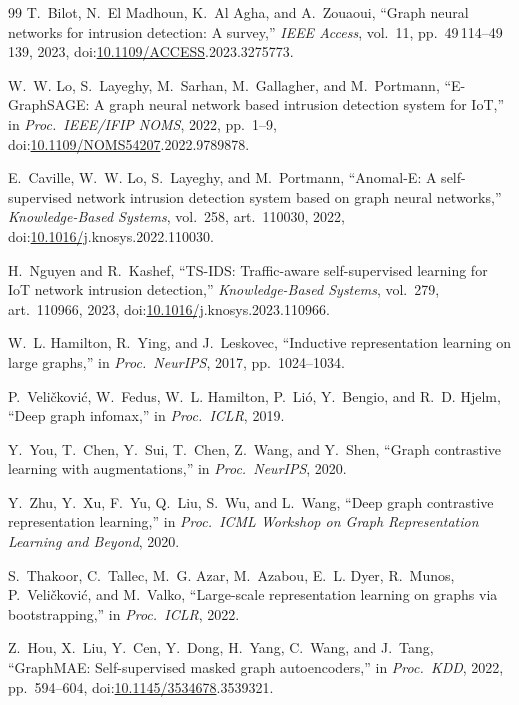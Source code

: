 \documentclass{ieeeaccess}
\begin{document}
\begin{thebibliography}{99}
T.~Bilot, N.~El Madhoun, K.~Al Agha, and A.~Zouaoui,
``Graph neural networks for intrusion detection: A survey,''
\emph{IEEE Access}, vol.~11, pp.~49\,114--49\,139, 2023,
doi:\href{https://doi.org/10.1109/ACCESS}{10.1109/ACCESS}.2023.3275773.

W.~W. Lo, S.~Layeghy, M.~Sarhan, M.~Gallagher, and M.~Portmann,
``E-GraphSAGE: A graph neural network based intrusion detection system for
IoT,'' in \emph{Proc.\ IEEE/IFIP NOMS}, 2022, pp.~1--9,
doi:\href{https://doi.org/10.1109/NOMS54207}{10.1109/NOMS54207}.2022.9789878.

E.~Caville, W.~W. Lo, S.~Layeghy, and M.~Portmann,
``Anomal-E: A self-supervised network intrusion detection system based on
graph neural networks,''
\emph{Knowledge-Based Systems}, vol.~258, art.~110030, 2022,
doi:\href{https://doi.org/10.1016/j}{10.1016/j}.knosys.2022.110030.

H.~Nguyen and R.~Kashef,
``TS-IDS: Traffic-aware self-supervised learning for IoT network intrusion
detection,''
\emph{Knowledge-Based Systems}, vol.~279, art.~110966, 2023,
doi:\href{https://doi.org/10.1016/j}{10.1016/j}.knosys.2023.110966.

W.~L. Hamilton, R.~Ying, and J.~Leskovec,
``Inductive representation learning on large graphs,''
in \emph{Proc.\ NeurIPS}, 2017, pp.~1024--1034.

P.~Veli\v{c}kovi\'{c}, W.~Fedus, W.~L. Hamilton, P.~Li\'{o}, Y.~Bengio,
and R.~D. Hjelm,
``Deep graph infomax,''
in \emph{Proc.\ ICLR}, 2019.

Y.~You, T.~Chen, Y.~Sui, T.~Chen, Z.~Wang, and Y.~Shen,
``Graph contrastive learning with augmentations,''
in \emph{Proc.\ NeurIPS}, 2020.

Y.~Zhu, Y.~Xu, F.~Yu, Q.~Liu, S.~Wu, and L.~Wang,
``Deep graph contrastive representation learning,''
in \emph{Proc.\ ICML Workshop on Graph Representation Learning and
Beyond}, 2020.

S.~Thakoor, C.~Tallec, M.~G. Azar, M.~Azabou, E.~L. Dyer, R.~Munos,
P.~Veli\v{c}kovi\'{c}, and M.~Valko,
``Large-scale representation learning on graphs via bootstrapping,''
in \emph{Proc.\ ICLR}, 2022.

Z.~Hou, X.~Liu, Y.~Cen, Y.~Dong, H.~Yang, C.~Wang, and J.~Tang,
``GraphMAE: Self-supervised masked graph autoencoders,''
in \emph{Proc.\ KDD}, 2022, pp.~594--604,
doi:\href{https://doi.org/10.1145/3534678}{10.1145/3534678}.3539321.


\end{thebibliography}
\end{document}
